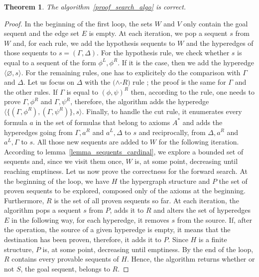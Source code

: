\documentclass[a4paper, 11pt]{article}
\newtheorem{theorem}{Theorem}
\begin{document}
    \begin{theorem}
	    The algorithm~\ref{proof_search_algo} is correct.
    \end{theorem}
    \begin{proof}
	In the beginning of the first loop, the sets $W$ and $V$ only contain the goal sequent and the
	    edge set $E$ is empty. At each iteration, we pop a sequent $s$ from $W$ and, for each rule,
	    we add the hypothesis sequents to $W$ and the hyperedges of those sequents to 
	    $s=(\Gamma,\Delta)$. For the 
	    hypothesis rule, we check whether $s$ is equal to a sequent of the form $\phi^L,\phi^R$.
	    If it is the case, then we add the hyperedge $\langle\varnothing,s\rangle$. For the
	    remaining rules, one has to explicitely do the comparison with $\Gamma$ and $\Delta$. Let us
	    focus on $\Delta$ with the $(\wedge$-$R)$ rule ; the proof is the same for $\Gamma$ and the
	    other rules. If $\Gamma$ is equal to $(\phi,\psi)^R$ then, according to the rule, one needs
	    to prove $\Gamma,\phi^R$ and $\Gamma,\psi^R$, therefore, the algorithm adds the hyperedge
	    $\langle\{(\Gamma,\phi^R),(\Gamma,\psi^R)\},s\rangle$. Finally, to handle the cut rule,
	    it enumerates every formula $a$ in the set of formulas that belong to axioms $A^*$ and
	    adds the hyperedges going from $\Gamma,a^R$ and $a^L,\Delta$ to $s$ and reciprocally, from
	    $\Delta,a^R$ and $a^L,\Gamma$ to $s$. All those new sequents are added to $W$ for the
	    following iteration. According to lemma~\ref{lemma_sequents_cardinal}, we explore a bounded
	    set of sequents and, since we visit them once, $W$ is, at some point, decreasing until
	    reaching emptiness.
	    Let us now prove the correctness for the forward search. At the beginning of the loop, we
	    have $H$ the hypergraph structure and $P$ the set of proven
	    sequents to be explored, composed only of the axioms at the beginning. Furthermore, $R$ is
	    the set of all proven sequents so far. At each iteration, the algorithm pops a sequent
	    $s$ from $P$, adds it to $R$ and alters the set of hyperedges $E$ in the following way,
	    for each hyperedge, it removes $s$ from the source. If, after the operation, the source
	    of a given hyperedge is empty, it means that the destination has been proven, therefore, it
	    adds it to $P$. Since $H$ is a finite structure, $P$ is, at some point, decreasing until 
	    emptiness. By the end of the loop, $R$ contains every provable sequents of $H$. Hence, the
	    algorithm returns whether or not $S$, the goal sequent, belongs to $R$.
    \end{proof}
\end{document}
